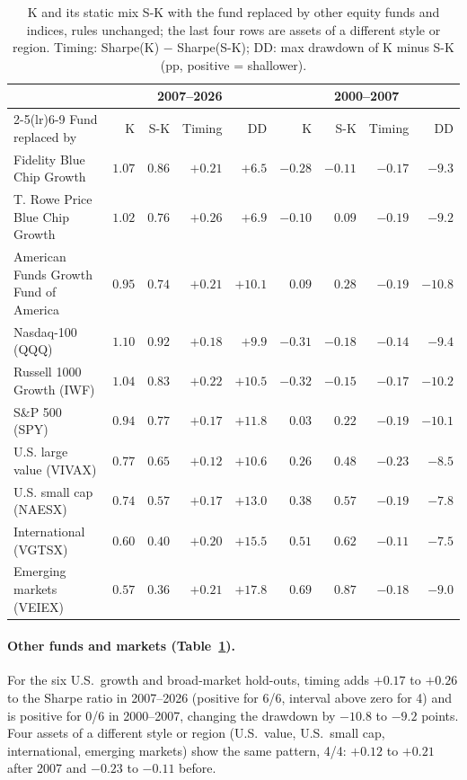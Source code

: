 \documentclass[11pt,a4paper]{article}
\begin{document}
\begin{table}[htbp]
\centering
\caption{K and its static mix S-K with the fund replaced by other equity funds and indices, rules unchanged; the
last four rows are assets of a different style or region.
Timing: Sharpe(K) $-$ Sharpe(S-K); DD: max drawdown of K minus S-K (pp, positive = shallower).}
\label{tab:hold}
\footnotesize
\setlength{\tabcolsep}{3.5pt}
\begin{tabular}{@{}lrrrrrrrr@{}}
\toprule
& \multicolumn{4}{c}{2007--2026} & \multicolumn{4}{c}{2000--2007} \\
\cmidrule(lr){2-5}\cmidrule(lr){6-9}
Fund replaced by & K & S-K & Timing & DD & K & S-K & Timing & DD \\
\midrule
Fidelity Blue Chip Growth & $1.07$ & $0.86$ & $+0.21$ & $+6.5$ & $-0.28$ & $-0.11$ & $-0.17$ & $-9.3$ \\
T. Rowe Price Blue Chip Growth & $1.02$ & $0.76$ & $+0.26$ & $+6.9$ & $-0.10$ & $0.09$ & $-0.19$ & $-9.2$ \\
American Funds Growth Fund of America & $0.95$ & $0.74$ & $+0.21$ & $+10.1$ & $0.09$ & $0.28$ & $-0.19$ & $-10.8$ \\
Nasdaq-100 (QQQ) & $1.10$ & $0.92$ & $+0.18$ & $+9.9$ & $-0.31$ & $-0.18$ & $-0.14$ & $-9.4$ \\
Russell 1000 Growth (IWF) & $1.04$ & $0.83$ & $+0.22$ & $+10.5$ & $-0.32$ & $-0.15$ & $-0.17$ & $-10.2$ \\
S\&P 500 (SPY) & $0.94$ & $0.77$ & $+0.17$ & $+11.8$ & $0.03$ & $0.22$ & $-0.19$ & $-10.1$ \\
\midrule
U.S. large value (VIVAX) & $0.77$ & $0.65$ & $+0.12$ & $+10.6$ & $0.26$ & $0.48$ & $-0.23$ & $-8.5$ \\
U.S. small cap (NAESX) & $0.74$ & $0.57$ & $+0.17$ & $+13.0$ & $0.38$ & $0.57$ & $-0.19$ & $-7.8$ \\
International (VGTSX) & $0.60$ & $0.40$ & $+0.20$ & $+15.5$ & $0.51$ & $0.62$ & $-0.11$ & $-7.5$ \\
Emerging markets (VEIEX) & $0.57$ & $0.36$ & $+0.21$ & $+17.8$ & $0.69$ & $0.87$ & $-0.18$ & $-9.0$ \\
\bottomrule
\end{tabular}
\end{table}

\paragraph{Other funds and markets (Table~\ref{tab:hold}).} For the six U.S.\ growth and broad-market hold-outs,
timing adds $+0.17$ to $+0.26$ to the Sharpe ratio in 2007--2026 (positive for 6/6, interval above zero for
4) and is positive for 0/6 in 2000--2007, changing the drawdown by $-10.8$ to $-9.2$ points. Four assets of a
different style or region (U.S.\ value, U.S.\ small cap, international, emerging markets) show the same pattern,
4/4: $+0.12$ to $+0.21$ after 2007 and $-0.23$ to $-0.11$ before.
\end{document}
